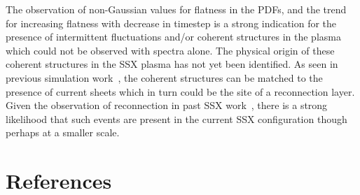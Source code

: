 \documentclass[12pt]{iopart}
\begin{document}
The observation of non-Gaussian values for flatness in the PDFs, and the trend for increasing flatness with decrease in timestep is a strong indication for the presence of intermittent fluctuations and/or coherent structures in the plasma which could not be observed with spectra alone. The physical origin of these coherent structures in the SSX plasma has not yet been identified. As seen in previous simulation work~\cite{Servidio11b}, the coherent structures can be matched to the presence of current sheets which in turn could be the site of a reconnection layer. Given the observation of reconnection in past SSX work~\cite{Cothran09,Gray10}, there is a strong likelihood that such events are present in the current SSX configuration though perhaps at a smaller scale.

\section*{References}
\end{document}
